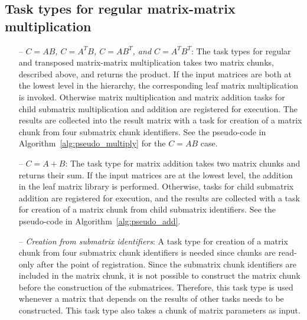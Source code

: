 \documentclass{elsarticle}
\begin{document}
\subsection{Task types for regular matrix-matrix multiplication}

\begin{itemize}
\item[--]\emph{$C = AB$, $C = A^TB$, $C = AB^T$, and $C = A^TB^T$}:
  The task types for regular and transposed matrix-matrix
  multiplication takes two matrix chunks, described above, and returns
  the product.  If the input matrices are both at the lowest level in
  the hierarchy, the corresponding leaf matrix multiplication is
  invoked.
  Otherwise matrix multiplication and matrix addition tasks for child
  submatrix multiplication and addition are registered for
  execution. The results are collected into the result matrix with a
  task for creation of a matrix chunk from four submatrix chunk
  identifiers. See the pseudo-code in
  Algorithm~\ref{alg:pseudo_multiply} for the $C = AB$ case.
\item[--]\emph{$C = A+B$}:
  The task type for matrix addition takes two matrix chunks and
  returns their sum. If the input matrices are at the lowest level,
  the addition in the leaf matrix library is performed.
  Otherwise, tasks for child submatrix addition are registered for
  execution, and the results are collected with a task for creation of
  a matrix chunk from child submatrix identifiers. See the pseudo-code
  in Algorithm~\ref{alg:pseudo_add}.
\item[--]\emph{Creation from submatrix identifiers}:
  A task type for creation of a matrix chunk from four submatrix chunk
  identifiers is needed since chunks are read-only after the point of
  registration. Since the submatrix chunk identifiers are included in
  the matrix chunk, it is not possible to construct the matrix chunk
  before the construction of the submatrices. Therefore, this task
  type is used whenever a matrix that depends on the results of other
  tasks needs to be constructed.
  This task type also takes a chunk of matrix parameters as input.
\end{itemize}
\end{document}
